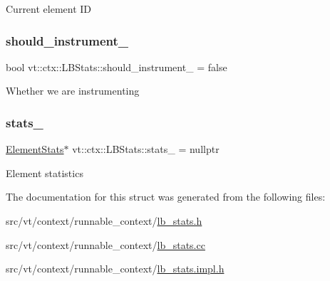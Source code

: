Current element ID \mbox{\label{structvt_1_1ctx_1_1_l_b_stats_ace63b8b294d303b5055a78a07ede6f5c}} 
\subsubsection{\texorpdfstring{should\+\_\+instrument\+\_\+}{should\_instrument\_}}
{\footnotesize\ttfamily bool vt\+::ctx\+::\+L\+B\+Stats\+::should\+\_\+instrument\+\_\+ = false\hspace{0.3cm}{\ttfamily [private]}}

Whether we are instrumenting \mbox{\label{structvt_1_1ctx_1_1_l_b_stats_a3cbfd8600aa3ba4284e3d2a6c4c7f07a}} 
\subsubsection{\texorpdfstring{stats\+\_\+}{stats\_}}
{\footnotesize\ttfamily \hyperlink{structvt_1_1ctx_1_1_l_b_stats_ae1eb05f8cd4ad63a08ff3cf87ef34e1d}{Element\+Stats}$\ast$ vt\+::ctx\+::\+L\+B\+Stats\+::stats\+\_\+ = nullptr\hspace{0.3cm}{\ttfamily [private]}}

Element statistics 

The documentation for this struct was generated from the following files\+:\begin{DoxyCompactItemize}
\item 
src/vt/context/runnable\+\_\+context/\hyperlink{lb__stats_8h}{lb\+\_\+stats.\+h}\item 
src/vt/context/runnable\+\_\+context/\hyperlink{lb__stats_8cc}{lb\+\_\+stats.\+cc}\item 
src/vt/context/runnable\+\_\+context/\hyperlink{lb__stats_8impl_8h}{lb\+\_\+stats.\+impl.\+h}\end{DoxyCompactItemize}
